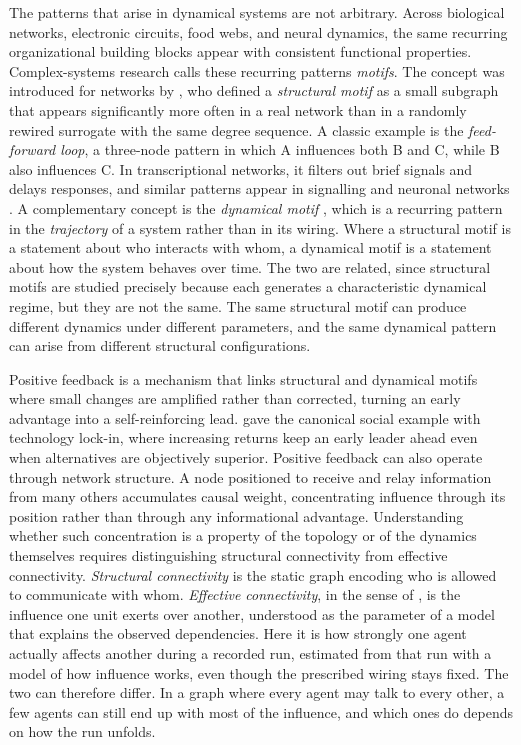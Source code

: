 The patterns that arise in dynamical systems are not arbitrary. Across
biological networks, electronic circuits, food webs, and neural dynamics,
the same recurring organizational building blocks appear with consistent
functional properties. Complex-systems research calls these recurring patterns
\emph{motifs}. The concept was introduced for networks by
\citet{milo2002network}, who defined a \emph{structural motif} as a small
subgraph that appears significantly more often in a real network than in a
randomly rewired surrogate with the same degree sequence. A classic example is 
the \emph{feed-forward loop}, a three-node pattern in which A influences both 
B and C, while B also influences C. In transcriptional networks, 
it filters out brief signals and delays responses, and similar patterns 
appear in signalling and neuronal networks \citep{alon2007network}. A
complementary concept is the \emph{dynamical motif} \citep{driscoll2024dynamical},
which is
a recurring pattern in the \emph{trajectory} of a system rather than in its
wiring. Where a structural motif is a statement about who interacts with whom,
a dynamical motif is a statement about how the system behaves over time. The
two are related, since structural motifs are studied precisely because each
generates a characteristic dynamical regime, but they are not the same. The
same structural motif can produce different dynamics under different
parameters, and the same dynamical pattern can arise from different structural
configurations.

Positive feedback is a mechanism that links structural and dynamical motifs where
small changes are amplified rather than corrected, turning an early advantage into
a self-reinforcing lead. \citet{arthur1989competing} gave the canonical social
example with technology lock-in, where increasing returns keep an early leader
ahead even when alternatives are objectively superior. Positive feedback can
also operate through network structure. A node positioned to receive and relay
information from many others accumulates causal weight, concentrating influence
through its position rather than through any informational advantage.
Understanding whether such concentration is a property of the
topology or of the dynamics themselves requires distinguishing structural
connectivity from effective connectivity.
\emph{Structural connectivity} is the static graph encoding who is allowed to
communicate with whom. \emph{Effective connectivity}, in the sense of
\citet{friston2011connectivity}, is the influence one unit exerts over another,
understood as the parameter of a model that explains the observed dependencies.
Here it is how strongly one agent actually affects another during a recorded
run, estimated from that run with a model of how influence works, even though
the prescribed wiring stays fixed. The two can therefore differ. In a graph where every agent
may talk to every other, a few agents can still end up with most of the
influence, and which ones do depends on how the run unfolds.

